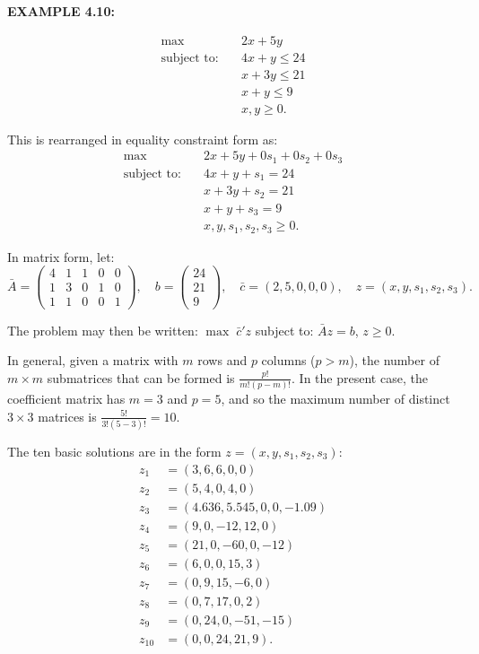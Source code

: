 \bigskip
\noindent\textbf{EXAMPLE 4.10:}
\begin{original}
\[
\begin{aligned}
\max \quad & 2x + 5y \\
\text{subject to:} \quad & 4x + y \le 24 \\
& x + 3y \le 21 \\
& x + y \le 9 \\
& x, y \ge 0.
\end{aligned}
\]

This is rearranged in equality constraint form as:
\[
\begin{aligned}
\max \quad & 2x + 5y + 0s_1 + 0s_2 + 0s_3 \\
\text{subject to:} \quad & 4x + y + s_1 = 24 \\
& x + 3y + s_2 = 21 \\
& x + y + s_3 = 9 \\
& x, y, s_1, s_2, s_3 \ge 0.
\end{aligned}
\]

In matrix form, let:
\[
\bar{A} = \begin{pmatrix} 4 & 1 & 1 & 0 & 0 \\ 1 & 3 & 0 & 1 & 0 \\ 1 & 1 & 0 & 0 & 1 \end{pmatrix},\quad
b = \begin{pmatrix} 24 \\ 21 \\ 9 \end{pmatrix},\quad
\bar{c} = (2,5,0,0,0),\quad z = (x, y, s_1, s_2, s_3).
\]

The problem may then be written: $\max \; \bar{c}'z$ subject to: $\bar{A}z = b$, $z \ge 0$.

In general, given a matrix with $m$ rows and $p$ columns ($p > m$), the number of $m \times m$ submatrices that can be formed is $\frac{p!}{m!(p-m)!}$. In the present case, the coefficient matrix has $m = 3$ and $p = 5$, and so the maximum number of distinct $3 \times 3$ matrices is $\frac{5!}{3!(5-3)!} = 10$.

The ten basic solutions are in the form $z = (x, y, s_1, s_2, s_3)$:
\[
\begin{aligned}
z_1 &= (3,6,6,0,0) \\
z_2 &= (5,4,0,4,0) \\
z_3 &= (4.636, 5.545, 0, 0, -1.09) \\
z_4 &= (9, 0, -12, 12, 0) \\
z_5 &= (21, 0, -60, 0, -12) \\
z_6 &= (6, 0, 0, 15, 3) \\
z_7 &= (0, 9, 15, -6, 0) \\
z_8 &= (0, 7, 17, 0, 2) \\
z_9 &= (0, 24, 0, -51, -15) \\
z_{10} &= (0, 0, 24, 21, 9).
\end{aligned}
\]


\end{original}
